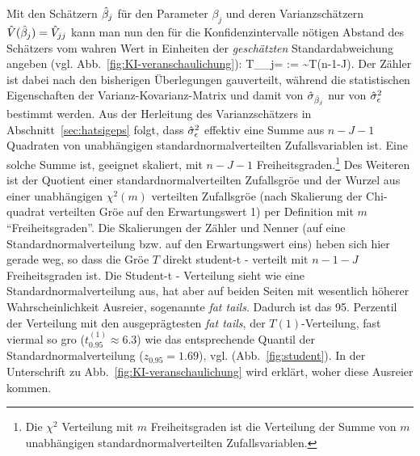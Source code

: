 Mit den Sch\"atzern $\hat{\beta}_j$ f\"ur den Parameter $\beta_j$ und 
deren Varianzsch\"atzern $\hat{V}(\hat{\beta}_j)=\hat{V}_{jj}$ kann man nun
den f\"ur die Konfidenzintervalle n\"otigen Abstand 
des Sch\"atzers vom wahren Wert in Einheiten der
\emph{gesch\"atzten} Standardabweichung angeben
(vgl. Abb.~\ref{fig:KI-veranschaulichung}): 
\be
\label{regrT}
T_{\beta_j}=
:= 
 \sim T(n-1-J).
\ee
Der Z\"ahler ist dabei nach den bisherigen \"Uberlegungen
gau\3verteilt, w\"ahrend die statistischen Eigenschaften der
Varianz-Kovarianz-Matrix und damit von $\hat{\sigma}_{\hat{\beta}_j}$ nur von
$\hat{\sigma}_{\epsilon}^2$ bestimmt werden. Aus der Herleitung des
Varianzsch\"atzers in Abschnitt~\ref{sec:hatsigeps} folgt, dass
$\hat{\sigma}_{\epsilon}^2$ effektiv eine Summe aus $n-J-1$ Quadraten von
unabh\"angigen standardnormalverteilten Zufallsvariablen 
ist. Eine solche Summe ist, geeignet skaliert,
 mit $n-J-1$
Freiheitsgraden.\footnote{Die $\chi^2$ Verteilung mit $m$
Freiheitsgraden ist die Verteilung der Summe von $m$ unabh\"angigen
standardnormalverteilten Zufallsvariablen.}
Des Weiteren ist der Quotient einer standardnormalverteilten Zufallsgr\"o\3e 
 und der Wurzel aus  einer unabh\"angigen $\chi^2(m)$ verteilten Zufallsgr\"o\3e
(nach Skalierung der Chi-quadrat verteilten Gr\"o\3e auf den
Erwartungswert 1) per Definition  mit $m$
``Freiheitsgraden''. Die Skalierungen der Z\"ahler und Nenner (auf
eine Standardnormalverteilung bzw. auf den Erwartungswert eins) heben sich
hier gerade weg, so dass die Gr\"o\3e $T$ direkt student-t - verteilt mit
$n-1-J$ Freiheitsgraden ist. Die Student-t - Verteilung sieht wie eine
Standardnormalverteilung aus, hat aber auf beiden Seiten mit
wesentlich h\"oherer Wahrscheinlichkeit Ausrei\3er, sogenannte
\emph{fat tails}. Dadurch ist das 95. Perzentil der Verteilung mit den
ausgepr\"agtesten \emph{fat tails}, der $T(1)$-Verteilung, fast
viermal so gro\3 ($t^{(1)}_{0.95}\approx 6.3$) wie das entsprechende
Quantil der Standardnormalverteilung ($z_{0.95}=1.69$), vgl.  (Abb.~\ref{fig:student}). In der Unterschrift zu
Abb.~\ref{fig:KI-veranschaulichung} wird erkl\"art, woher diese
Ausrei\3er kommen.

